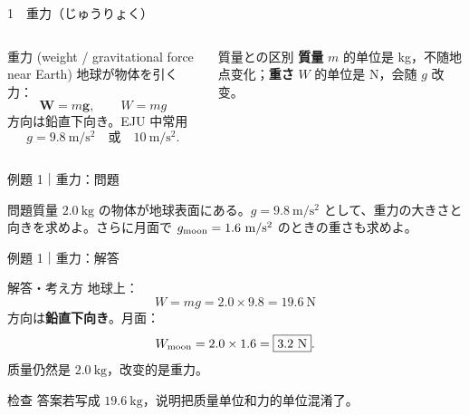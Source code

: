 \documentclass[notheorems,aspectratio=169]{beamer}
\newcommand{\jp}[1]{\textbf{\color{JapanBlue}#1}}
\newcommand{\en}[1]{\textcolor{GraphGray}{\scriptsize(#1)}}
\newcommand{\qcard}[1]{%
  \begin{block}{問題}\centering\large #1\end{block}}
\newcommand{\acard}[1]{%
  \begin{exampleblock}{解答・考え方}#1\end{exampleblock}}
\newcommand{\forcearrow}[5]{%
  \draw[-{Latex[length=3mm]},very thick,#5] (#1,#2)--++(#3,#4);}
\begin{document}
\begin{frame}{1　重力（じゅうりょく）}
\begin{columns}[c]
\begin{block}{重力 \en{weight / gravitational force near Earth}}
地球が物体を引く力：
\[
  \bm W=m\bm g,\qquad W=mg
\]
方向は鉛直下向き。EJU 中常用
\[
g=9.8\ \mathrm{m/s^2}\quad\text{或}\quad 10\ \mathrm{m/s^2}.
\]
\end{block}
\begin{alertblock}{質量との区別}
\jp{質量} $m$ 的单位是 kg，不随地点变化；\jp{重さ} $W$ 的单位是 N，会随 $g$ 改变。
\end{alertblock}
\centering
{}
\end{columns}
\end{frame}

\begin{frame}{例題 1｜重力：問題}
\vfill
\qcard{質量 $2.0\ \mathrm{kg}$ の物体が地球表面にある。$g=9.8\ \mathrm{m/s^2}$ として、重力の大きさと向きを求めよ。さらに月面で $g_{\rm moon}=1.6\ \mathrm{m/s^2}$ のときの重さも求めよ。}
\vfill
\end{frame}

\begin{frame}{例題 1｜重力：解答}
\acard{
地球上：
\[
W=mg=2.0\times9.8=\boxed{19.6\ \mathrm N}
\]
方向は\jp{鉛直下向き}。月面：
\[
W_{\rm moon}=2.0\times1.6=\boxed{3.2\ \mathrm N}.
\]
质量仍然是 $2.0\ \mathrm{kg}$，改变的是重力。}
\begin{alertblock}{检查}
答案若写成 $19.6\ \mathrm{kg}$，说明把质量单位和力的单位混淆了。
\end{alertblock}
\end{frame}
\end{document}
